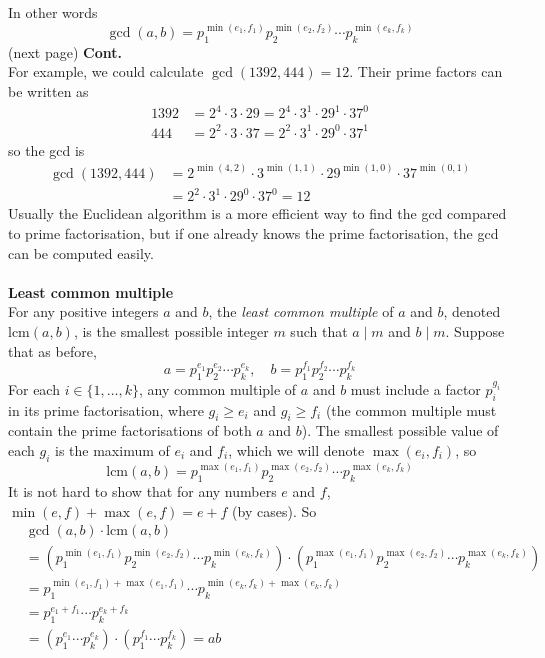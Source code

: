 \documentclass{report}
\theoremstyle{definition}
\begin{document}
In other words 
\begin{equation*}
\gcd(a,b)=p_1^{\min(e_1,f_1)}p_2^{\min(e_2,f_2)}\cdots p_k^{\min(e_k,f_k)}
\end{equation*}
(next page)\newpage
\noindent\textbf{Cont.}\\
For example, we could calculate $\gcd(1392,444)=12$. Their prime factors can be written as
\begin{align*}
1392&=2^4\cdot3\cdot29=2^4\cdot3^1\cdot29^1\cdot37^0\\
444&=2^2\cdot3\cdot37=2^2\cdot3^1\cdot29^0\cdot37^1
\end{align*}
so the gcd is
\begin{align*}
\gcd(1392,444)&=2^{\min(4,2)}\cdot3^{\min(1,1)}\cdot29^{\min(1,0)}\cdot37^{\min(0,1)}\\
&=2^2\cdot3^1\cdot29^0\cdot37^0=12
\end{align*}
Usually the Euclidean algorithm is a more efficient way to find the gcd compared to prime factorisation, but if one already knows the prime factorisation, the gcd can be computed easily.\\
\vspace{1mm}\\
\noindent\textbf{Least common multiple}\\
For any positive integers $a$ and $b$, the \textit{least common multiple} of $a$ and $b$, denoted $\text{lcm}(a,b)$, is the smallest possible integer $m$ such that $a\mid m$ and $b\mid m$. 
Suppose that as before, 
\begin{equation*}
a=p_1^{e_1}p_2^{e_2}\cdots p_k^{e_k},\quad b=p_1^{f_1}p_2^{f_2}\cdots p_k^{f_k}
\end{equation*}
For each $i\in\{1,\ldots,k\}$, any common multiple of $a$ and $b$ must include a factor $p_i^{g_i}$
in its prime factorisation, where $g_i\geq e_i$ and $g_i\geq f_i$ (the common multiple must 
contain the prime factorisations of both $a$ and $b$). The smallest possible value of each $g_i$ is the maximum of $e_i$ and $f_i$, which we will denote $\max(e_i,f_i)$, so
\begin{equation*}
\text{lcm}(a,b)=p_1^{\max(e_1,f_1)}p_2^{\max(e_2,f_2)}\cdots p_k^{\max(e_k,f_k)}
\end{equation*}
It is not hard to show that for any numbers $e$ and $f$, $\min(e,f)+\max(e,f)=e+f$ (by cases). So
\begin{align*}
&\gcd(a,b)\cdot\text{lcm}(a,b)\\&=\left(p_1^{\min(e_1,f_1)}p_2^{\min(e_2,f_2)}\cdots p_k^{\min(e_k,f_k)}\right)\cdot\left(p_1^{\max(e_1,f_1)}p_2^{\max(e_2,f_2)}\cdots p_k^{\max(e_k,f_k)}\right)\\
&=p_1^{\min(e_1,f_1)+\max(e_1,f_1)}\cdots p_k^{\min(e_k,f_k)+\max(e_k,f_k)}\\
&=p_1^{e_1+f_1}\cdots p_k^{e_k+f_k}\\
&=(p_1^{e_1}\cdots p_k^{e_k})\cdot(p_1^{f_1}\cdots p_k^{f_k})=ab
\end{align*}
\end{document}
